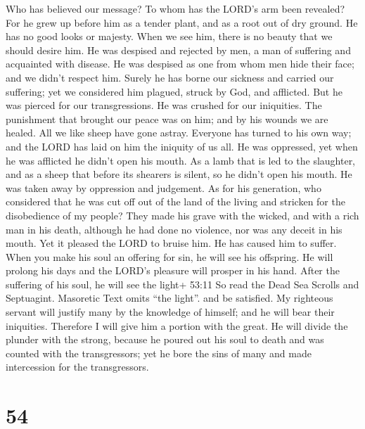  Who has believed our message? To whom has the LORD's arm
been revealed?  For he grew up before him as a tender plant,
and as a root out of dry ground. He has no good looks or majesty. When
we see him, there is no beauty that we should desire him. 
He was despised and rejected by men, a man of suffering and acquainted
with disease. He was despised as one from whom men hide their face; and
we didn't respect him.  Surely he has borne our sickness and
carried our suffering; yet we considered him plagued, struck by God, and
afflicted.  But he was pierced for our transgressions. He
was crushed for our iniquities. The punishment that brought our peace
was on him; and by his wounds we are healed.  All we like
sheep have gone astray. Everyone has turned to his own way; and the LORD
has laid on him the iniquity of us all.  He was oppressed,
yet when he was afflicted he didn't open his mouth. As a lamb that is
led to the slaughter, and as a sheep that before its shearers is silent,
so he didn't open his mouth.  He was taken away by
oppression and judgement. As for his generation, who considered that he
was cut off out of the land of the living and stricken for the
disobedience of my people?  They made his grave with the
wicked, and with a rich man in his death, although he had done no
violence, nor was any deceit in his mouth.  Yet it pleased
the LORD to bruise him. He has caused him to suffer. When you make his
soul an offering for sin, he will see his offspring. He will prolong his
days and the LORD's pleasure will prosper in his hand. 
After the suffering of his soul, he will see the light+ 53:11 So read
the Dead Sea Scrolls and Septuagint. Masoretic Text omits ``the light''.
and be satisfied. My righteous servant will justify many by the
knowledge of himself; and he will bear their iniquities. 
Therefore I will give him a portion with the great. He will divide the
plunder with the strong, because he poured out his soul to death and was
counted with the transgressors; yet he bore the sins of many and made
intercession for the transgressors.

\hypertarget{section-50}{%
\section{54}\label{section-50}}

